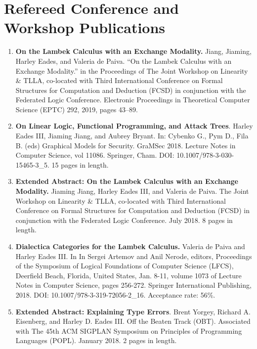 \documentclass[11pt]{article}
\begin{document}
  \section{Refereed Conference and Workshop Publications}
  \label{subsec:symposium_publications}
  \begin{enumerate}

  \item[] \textbf{On the Lambek Calculus with an Exchange Modality.}
    Jiang, Jiaming, Harley Eades, and Valeria de Paiva. “On the Lambek
    Calculus with an Exchange Modality.” in the Proceedings of The
    Joint Workshop on Linearity \& TLLA, co-located with Third
    International Conference on Formal Structures for Computation and
    Deduction (FCSD) in conjunction with the Federated Logic
    Conference.  Electronic Proceedings in Theoretical Computer
    Science (EPTC) 292, 2019, pages 43–89.
    
  \item[] \textbf{On Linear Logic, Functional Programming, and Attack
    Trees}. Harley Eades III, Jiaming Jiang, and Aubrey Bryant. In:
    Cybenko G., Pym D., Fila B. (eds) Graphical Models for
    Security. GraMSec 2018. Lecture Notes in Computer Science, vol
    11086. Springer, Cham. DOI: 10.1007/978-3-030-15465-3\_5. 15 pages
    in length.

  \item[] \textbf{Extended Abstract: On the Lambek Calculus with an
    Exchange Modality.}  Jiaming Jiang, Harley Eades III, and Valeria
    de Paiva. The Joint Workshop on Linearity \& TLLA, co-located with
    Third International Conference on Formal Structures for
    Computation and Deduction (FCSD) in conjunction with the Federated
    Logic Conference. July 2018. 8 pages in length.
    
  \item[] \textbf{Dialectica Categories for the Lambek Calculus.}
    Valeria de Paiva and Harley Eades III. In In Sergei Artemov and
    Anil Nerode, editors, Proceedings of the Symposium of Logical
    Foundations of Computer Science (LFCS), Deerfield Beach, Florida,
    United States, Jan. 8-11, volume 1073 of Lecture Notes in Computer
    Science, pages 256-272. Springer International Publishing,
    2018. DOI: 10.1007/978-3-319-72056-2\_16.  Acceptance rate: 56\%.    
    
  \item[] \textbf{Extended Abstract: Explaining Type Errors}.  Brent
    Yorgey, Richard A. Eisenberg, and Harley D. Eades III. Off the
    Beaten Track (OBT). Associated with The 45th ACM SIGPLAN Symposium
    on Principles of Programming Languages (POPL). January 2018. 2
    pages in length.
       

\end{enumerate}
\end{document}
